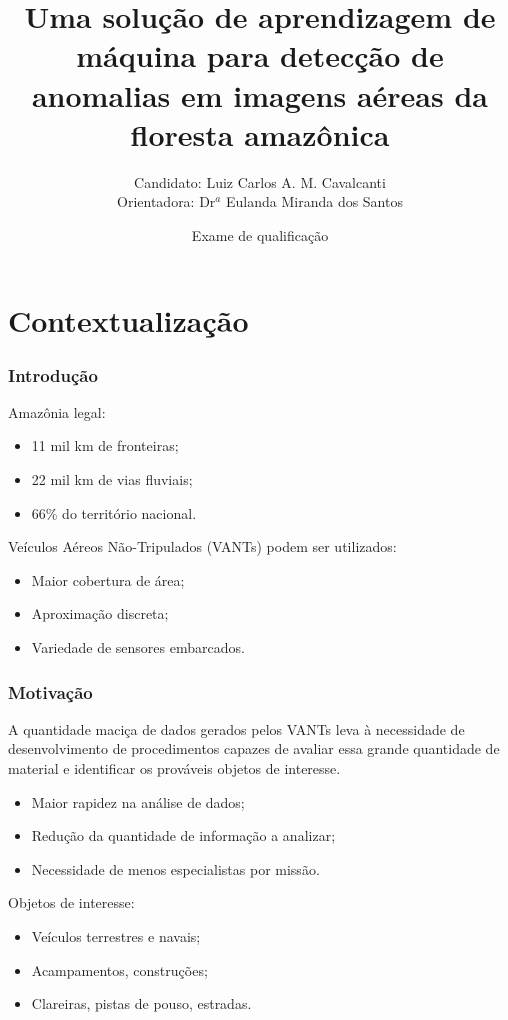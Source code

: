 \documentclass[t]{beamer}
\title %
{Uma solução de aprendizagem de máquina para detecção de anomalias em imagens aéreas da floresta amazônica}
\author %
{Candidato: Luiz Carlos A. M. Cavalcanti
\\Orientadora: Dr$^a$ Eulanda Miranda dos Santos} %
\date[] %
{Exame de qualificação}
\begin{document}
  \begin{frame}\titlepage\end{frame}


\section{Contextualização}

\begin{frame}
\frametitle{Introdução}

	Amazônia legal:
	\begin{itemize}
		\item 11 mil km de fronteiras;
		\item 22 mil km de vias fluviais;
		\item 66\% do território nacional.
	\end{itemize}

	\vspace{0.5cm}

	Veículos Aéreos Não-Tripulados (VANTs) podem ser utilizados:
	\begin{itemize}
		\item Maior cobertura de área;
		\item Aproximação discreta;
		\item Variedade de sensores embarcados.
	\end{itemize}

\end{frame}

\begin{frame}
\frametitle{Motivação}

A quantidade maciça de dados gerados pelos VANTs leva à necessidade de desenvolvimento de procedimentos capazes de avaliar essa grande quantidade de material e identificar os prováveis objetos de interesse.

\begin{itemize}
	\item Maior rapidez na análise de dados;
	\item Redução da quantidade de informação a analizar;
	\item Necessidade de menos especialistas por missão.
\end{itemize}

Objetos de interesse:
\begin{itemize}
	\item Veículos terrestres e navais;
	\item Acampamentos, construções;
	\item Clareiras, pistas de pouso, estradas.
\end{itemize}



\end{frame}
\end{document}
